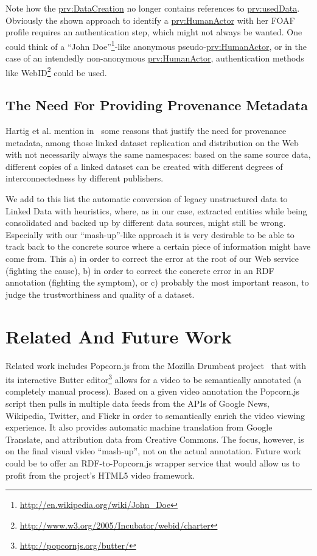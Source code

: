 \documentclass{acm_proc_article-sp}
\begin{document}
Note how the \url{prv:DataCreation} no longer contains references to \url{prv:usedData}. Obviously the shown approach to identify a \url{prv:HumanActor} with her FOAF profile requires an authentication step, which might not always be wanted. One could think of a ``John Doe''\footnote{\url{http://en.wikipedia.org/wiki/John_Doe}}-like anonymous pseudo-\url{prv:HumanActor}, or in the case of an intendedly non-anonymous \url{prv:HumanActor}, authentication methods like WebID\footnote{\url{http://www.w3.org/2005/Incubator/webid/charter}} could be used.

\subsection{The Need For Providing Provenance Metadata}
Hartig et al. mention in~\cite{ipaw10:olaf} some reasons that justify the need for provenance metadata, among those linked dataset replication and distribution on the Web with not necessarily always the same namespaces: based on the same source data, different copies of a linked dataset can be created with different degrees of interconnectedness by different publishers.

We add to this list the automatic conversion of legacy unstructured data to Linked Data with heuristics, where, as in our case, extracted entities while being consolidated and backed up by different data sources, might still be wrong. Especially with our ``mash-up''-like approach it is very desirable to be able to track back to the concrete source where a certain piece of information might have come from. This a) in order to correct the error at the root of our Web service (fighting the cause), b) in order to correct the concrete error in an RDF annotation (fighting the symptom), or c) probably the most important reason, to judge the trustworthiness and quality of a dataset.


\section{Related And Future Work}\label{sec:related}
Related work includes Popcorn.js from the Mozilla Drumbeat project~\cite{Drumbeat:Popcorn} that with its interactive Butter editor\footnote{\url{http://popcornjs.org/butter/}} allows for a video to be semantically annotated (a completely manual process). Based on a given video annotation the Popcorn.js script then pulls in multiple data feeds from the APIs of Google News, Wikipedia, Twitter, and Flickr in order to semantically enrich the video viewing experience. It also provides automatic machine translation from Google Translate, and attribution data from Creative Commons. The focus, however, is on the final visual video ``mash-up'', not on the actual annotation. Future work could be to offer an RDF-to-Popcorn.js wrapper service that would allow us to profit from the project's HTML5 video framework.
\end{document}
